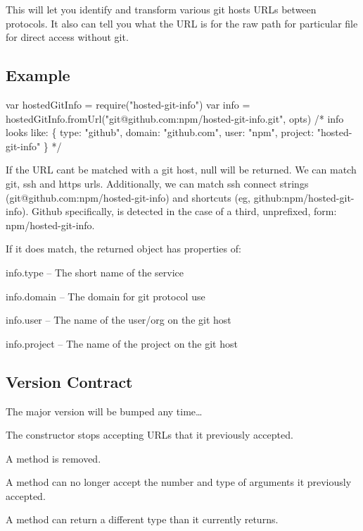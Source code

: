 This will let you identify and transform various git hosts U\+R\+Ls between protocols. It also can tell you what the U\+RL is for the raw path for particular file for direct access without git.

\subsection*{Example}


\begin{DoxyCode}
var hostedGitInfo = require("hosted-git-info")
var info = hostedGitInfo.fromUrl("git@github.com:npm/hosted-git-info.git", opts)
/* info looks like:
\{
  type: "github",
  domain: "github.com",
  user: "npm",
  project: "hosted-git-info"
\}
*/
\end{DoxyCode}


If the U\+RL can\textquotesingle{}t be matched with a git host, {\ttfamily null} will be returned. We can match git, ssh and https urls. Additionally, we can match ssh connect strings ({\ttfamily git@github.\+com\+:npm/hosted-\/git-\/info}) and shortcuts (eg, {\ttfamily github\+:npm/hosted-\/git-\/info}). Github specifically, is detected in the case of a third, unprefixed, form\+: {\ttfamily npm/hosted-\/git-\/info}.

If it does match, the returned object has properties of\+:


\begin{DoxyItemize}
\item info.\+type -- The short name of the service
\item info.\+domain -- The domain for git protocol use
\item info.\+user -- The name of the user/org on the git host
\item info.\+project -- The name of the project on the git host
\end{DoxyItemize}

\subsection*{Version Contract}

The major version will be bumped any time…


\begin{DoxyItemize}
\item The constructor stops accepting U\+R\+Ls that it previously accepted.
\item A method is removed.
\item A method can no longer accept the number and type of arguments it previously accepted.
\item A method can return a different type than it currently returns.
\end{DoxyItemize}

